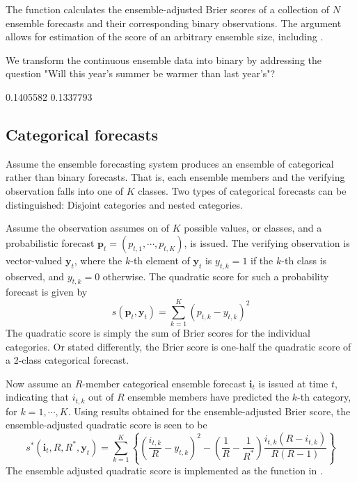 \documentclass[article]{jss}
\begin{document}
The  function  calculates the ensemble-adjusted Brier scores of a collection of $N$ ensemble forecasts and their corresponding binary observations. 
The argument  allows for estimation of the score of an arbitrary ensemble size, including .


We transform the continuous ensemble data into binary by addressing the question "Will this year's summer be warmer than last year's"?

\begin{Schunk}
\begin{Soutput}
[1] 0.1405582 0.1337793
\end{Soutput}
\end{Schunk}



\subsection{Categorical forecasts}


Assume the ensemble forecasting system produces an ensemble of categorical rather than binary forecasts.
That is, each ensemble members and the verifying observation falls into one of $K$ classes.
Two types of categorical forecasts can be distinguished: Disjoint categories and nested categories.

Assume the observation assumes on of $K$ possible values, or classes, and a probabilistic forecast $_t = (p_{t,1}, \cdots, p_{t,K})$, is issued.
The verifying observation is vector-valued $_t$, where the $k$-th element of $_t$ is $y_{t,k}=1$ if the $k$-th class is observed, and $y_{t,k}=0$ otherwise.
The quadratic score for such a probability forecast is given by
%
\begin{equation}
s(\mathbf{p}_t, \mathbf{y}_t) = \sum_{k=1}^K \left(p_{t,k} - y_{t,k}\right)^2
\end{equation}
%
The quadratic score is simply the sum of Brier scores for the individual categories.
Or stated differently, the Brier score is one-half the quadratic score of a 2-class categorical forecast.

Now assume an $R$-member categorical ensemble forecast $_t$ is issued at time $t$, indicating that $i_{t,k}$ out of $R$ ensemble members have predicted the $k$-th category, for $k=1,\cdots,K$.
Using results obtained for the ensemble-adjusted Brier score, the ensemble-adjusted quadratic score is seen to be
%
\begin{equation}
s^*(\mathbf{i}_t, R, R^*, \mathbf{y}_t) = \sum_{k=1}^K \left\{ \left(\frac{i_{t,k}}{R} - y_{t,k}\right)^2 - \left(\frac{1}{R} - \frac{1}{R^*}\right) \frac{i_{t,k}(R-i_{t,k})}{R(R-1)}\right\}
\end{equation}
%
The ensemble adjusted quadratic score is implemented as the function  in .
\end{document}
